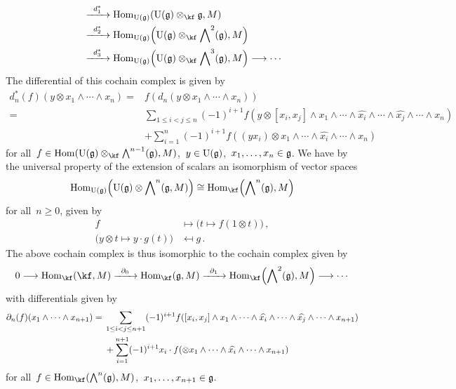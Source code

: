 \begin{construction}
\begin{enumerate}
\begin{align*}
        &\xto{d_1^*}
        \Hom_{\Univ(\glie)}( \Univ(\glie) \otimes_{\kf} \glie, M )
        \\
        &\xto{d_2^*}
        \Hom_{\Univ(\glie)}\Bigl( \Univ(\glie) \otimes_{\kf} \Exterior^2(\glie), M \Bigr)
        \\
        &\xto{d_3^*}
        \Hom_{\Univ(\glie)}\Bigl( \Univ(\glie) \otimes_{\kf} \Exterior^3(\glie), M \Bigr)
        \to
        \dotsb
      \end{align*}
      The differential of this cochain complex is given by
      \begin{align*}
        d_n^*(f)( y \otimes x_1 \wedge \dotsb \wedge x_n )
        ={}&
        f( d_n(y \otimes x_1 \wedge \dotsb \wedge x_n) )
        \\
        ={}&
        \sum_{1 \leq i < j \leq n}
        (-1)^{i+1}
        f
        (
          y \otimes
          [x_i, x_j] \wedge x_1 \wedge \dotsb \wedge \widehat{x_i} \wedge \dotsb \wedge \widehat{x_j} \wedge \dotsb \wedge x_n
        )
        \\
        {}&
        +
        \sum_{i=1}^n
        (-1)^{i+1}
        f( (y x_i) \otimes x_1 \wedge \dotsb \wedge \widehat{x_i} \wedge \dotsb \wedge x_n )
      \end{align*}
      for all~$f \in \Hom( \Univ(\glie) \otimes_{\kf} \Exterior^{n-1}(\glie), M )$,~$y \in \operatorname{U}(\mathfrak{g})$,~$x_1, \dotsc, x_n \in \mathfrak{g}$.
      We have by the universal property of the extension of scalars an isomorphism of vector spaces
      \[
        \Hom_{\Univ(\glie)}\Bigl( \Univ(\glie) \otimes \Exterior^n( \glie, M ) \Bigr)
        \cong
        \Hom_{\kf}\Bigl( \Exterior^n(\glie), M \Bigr)
      \]
      for all~$n \geq 0$, given by
      \begin{align*}
        f
        &\mapsto
        \bigl( t \mapsto f(1 \otimes t) \bigr) \,, \\
        \bigl( y \otimes t \mapsto y \cdot g(t) \bigr)
        &\mapsfrom
        g \,.
      \end{align*}
      The above cochain complex is thus isomorphic to the cochain complex given by
      \[
        0
        \to
        \Hom_{\kf}( \kf, M )
        \xto{\del_0}
        \Hom_{\kf}( \glie, M )
        \xto{\del_1}
        \Hom_{\kf}\Bigl( \Exterior^2(\glie), M \Bigr)
        \to
        \dotsb
      \]
      with differentials given by
      \begin{align*}
        \partial_n(f)(x_1 \wedge \dotsb \wedge x_{n+1})
        ={}&
        \sum_{1 \leq i < j \leq n+1}
        (-1)^{i+1}
        f
        (
          [x_i, x_j] \wedge
          x_1 \wedge \dotsb \wedge \widehat{x_i} \wedge \dotsb \wedge \widehat{x_j} \wedge \dotsb \wedge x_{n+1}
        )
        \\
        {}&
        +
        \sum_{i=1}^{n+1}
        (-1)^{i+1}
        x_i \cdot f( \otimes x_1 \wedge \dotsb \wedge \widehat{x_i} \wedge \dotsb \wedge x_{n+1} )
      \end{align*}
      for all~$f \in \Hom_{\kf}( \Exterior^n(\glie), M )$,~$x_1, \dotsc, x_{n+1} \in \mathfrak{g}$.


\end{enumerate}
\end{construction}

